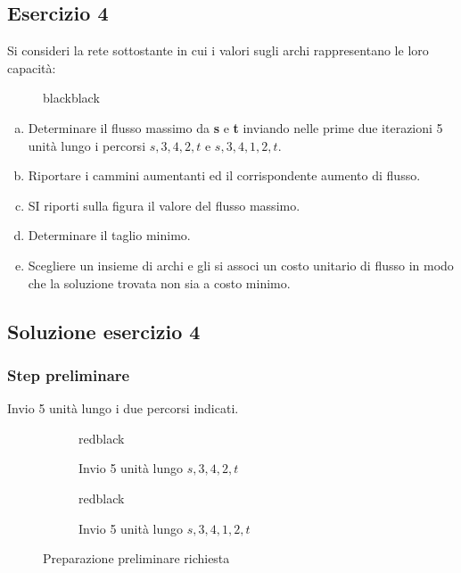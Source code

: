 \documentclass[\main/main.tex]{subfiles}
\def\red{red}
\def\black{black}
\newcommand{\currentGraphPreloader}[9]{
  \def\currentGraphArgI{#1}%
  \def\currentGraphArgII{#2}%
  \def\currentGraphArgIII{#3}%
  \def\currentGraphArgIV{#4}%
  \def\currentGraphArgV{#5}%
  \def\currentGraphArgVI{#6}%
  \def\currentGraphArgVII{#7}%
  \def\currentGraphArgVIII{#8}%
  \def\currentGraphArgIX{#9}%
  \secondCurrentGraphPreloader
}
\newcommand{\secondCurrentGraphPreloader}[9]{
  \def\currentGraphArgX{#1}%
  \def\currentColorI{#2}%
  \def\currentColorII{#3}%
  \def\currentColorIII{#4}%
  \def\currentColorIV{#5}%
  \def\currentColorV{#6}%
  \def\currentColorVI{#7}%
  \def\currentColorVII{#8}%
  \def\currentColorVIII{#9}%
  \currentGraph
}
\begin{document}
\subsection{Esercizio 4}
Si consideri la rete sottostante in cui i valori sugli archi rappresentano le loro capacità:

\begin{figure}
  \currentGraphPreloader
  {0}{0}{0}{0}{0}
  {0}{0}{0}{0}{0}
  {\black}{\black}{\black}{\black}{\black}
  {\black}{\black}{\black}{\black}{\black}
\end{figure}

\begin{enumerate}[a)]
  \item Determinare il flusso massimo da \textbf{s} e \textbf{t} inviando nelle prime due iterazioni 5 unità lungo i percorsi $s,3,4,2,t$ e $s,3,4,1,2,t$.
  \item Riportare i cammini aumentanti ed il corrispondente aumento di flusso.
  \item SI riporti sulla figura il valore del flusso massimo.
  \item Determinare il taglio minimo.
  \item Scegliere un insieme di archi e gli si associ un costo unitario di flusso in modo che la soluzione trovata non sia a costo minimo.
\end{enumerate}

\subsection{Soluzione esercizio 4}
\subsubsection*{Step preliminare}
Invio 5 unità lungo i due percorsi indicati.

\begin{figure}
  \begin{subfigure}{0.49\textwidth}
    \currentGraphPreloader
    {0}{5}{0}{5}{0}
    {5}{0}{0}{5}{0}
    {\black}{\red}{\black}{\red}{\black}
    {\red}{\black}{\black}{\red}{\black}
    \caption{Invio 5 unità lungo $s,3,4,2,t$}
  \end{subfigure}
  \begin{subfigure}{0.49\textwidth}
    \currentGraphPreloader
    {0}{10}{0}{10}{5}
    {5}{0}{5}{10}{0}
    {\black}{\red}{\black}{\red}{\red}
    {\black}{\black}{\red}{\red}{\black}
    \caption{Invio 5 unità lungo $s,3,4,1,2,t$}
  \end{subfigure}
  \caption{Preparazione preliminare richiesta}
\end{figure}
\end{document}
